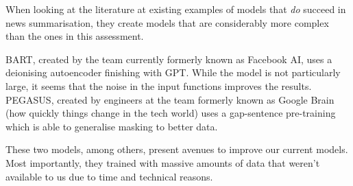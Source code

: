 When looking at the literature at existing examples of models that \emph{do} succeed in news summarisation, they create models that are considerably more complex than the ones in this assessment.

BART\cite{bart_model}, created by the team currently formerly known as Facebook AI, uses a deionising autoencoder finishing with GPT.
While the model is not particularly large, it seems that the noise in the input functions improves the results.
PEGASUS\cite{pegasus_model}, created by engineers at the team formerly known as Google Brain (how quickly things change in the tech world) uses a gap-sentence pre-training which is able to generalise masking to better data.

These two models, among others, present avenues to improve our current models.
Most importantly, they trained with massive amounts of data that weren't available to us due to time and technical reasons.

